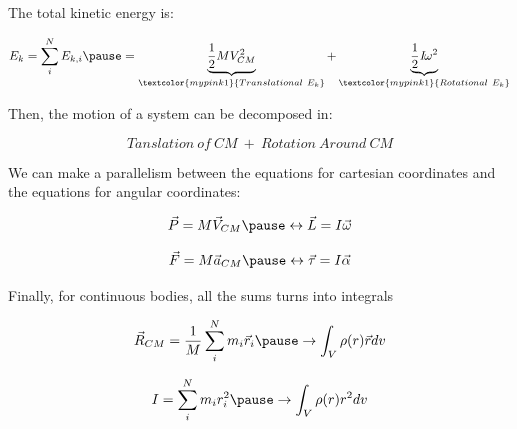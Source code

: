 \documentclass[]{beamer}
\begin{document}
\begin{frame}

  The total kinetic energy is:
  
  \pause
  \vspace{3mm}
  
  \begin{equation}
    E_k=\sum^N_i E_{k,i} \pause=\underbrace{\frac{1}{2}MV^2_{CM}}_{\textcolor{mypink1}{Translational~E_k}}+\underbrace{\frac{1}{2}\textit{I}\omega^2}_{\textcolor{mypink1}{Rotational~E_k}}
  \end{equation}
  
  \pause
  \vspace{3mm}
  
  Then, the motion of a system can be decomposed in:
  
  \pause 
  \begin{equation*}
    Tanslation~of~CM~+~Rotation~Around~CM
  \end{equation*}
  
  
  \end{frame}
\begin{frame}

  We can make a parallelism between the equations for cartesian coordinates and the equations for angular coordinates:

  
  \pause
  
  \begin{equation}
\vec{P}=M\vec{V}_{CM} \pause \leftrightarrow \vec{L}=I\vec{\omega }
  \end{equation}

  \pause
  
  \begin{equation}
\vec{F}=M\vec{a}_{CM}\pause \leftrightarrow \vec{\tau}=I\vec{\alpha }
  \end{equation}


  \end{frame}
\begin{frame}

Finally, for continuous bodies, all the sums turns into integrals
  


\begin{equation}
  \vec{R}_{CM}=\frac{1}{M}\sum^N_i m_i \vec{r}_i \pause \rightarrow \int_V \rho(r) \vec{r} dv
\end{equation}

  \pause

\begin{equation}
    I=\sum^N_i m_i r^2_i \pause \rightarrow \int_V \rho(r) r^2 dv
\end{equation}


\pause



  \end{frame}
\end{document}

